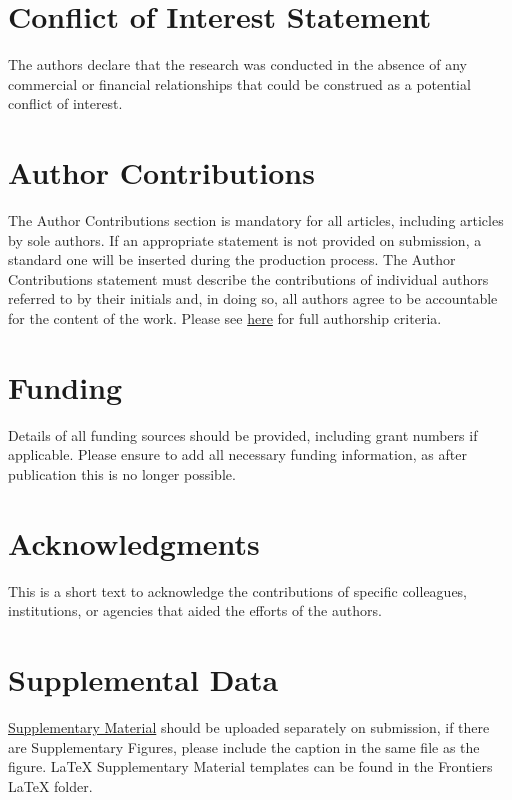 \documentclass[utf8]{frontiersSCNS} %
\begin{document}

\section*{Conflict of Interest Statement}

The authors declare that the research was conducted in the absence of any commercial or financial relationships that could be construed as a potential conflict of interest.

\section*{Author Contributions}

The Author Contributions section is mandatory for all articles, including articles by sole authors. If an appropriate statement is not provided on submission, a standard one will be inserted during the production process. The Author Contributions statement must describe the contributions of individual authors referred to by their initials and, in doing so, all authors agree to be accountable for the content of the work. Please see  \href{http://home.frontiersin.org/about/author-guidelines#AuthorandContributors}{here} for full authorship criteria.

\section*{Funding}
Details of all funding sources should be provided, including grant numbers if applicable. Please ensure to add all necessary funding information, as after publication this is no longer possible.

\section*{Acknowledgments}
This is a short text to acknowledge the contributions of specific colleagues, institutions, or agencies that aided the efforts of the authors.

\section*{Supplemental Data}
 \href{http://home.frontiersin.org/about/author-guidelines#SupplementaryMaterial}{Supplementary Material} should be uploaded separately on submission, if there are Supplementary Figures, please include the caption in the same file as the figure. LaTeX Supplementary Material templates can be found in the Frontiers LaTeX folder.
\end{document}
